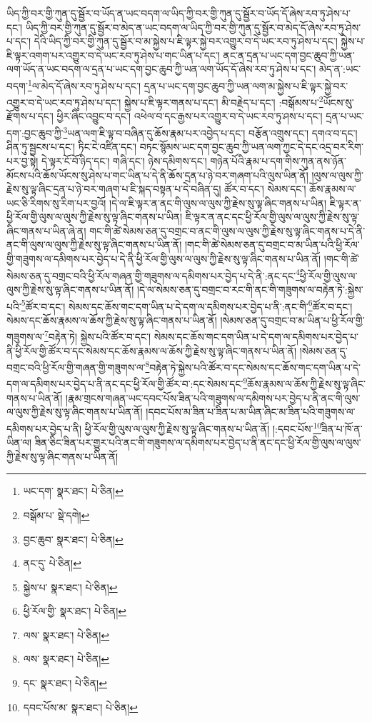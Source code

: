 ཡིད་ཀྱི་བར་གྱི་ཀུན་དུ་སྦྱོར་བ་ཡོད་ན་ཡང་བདག་ལ་ཡིད་ཀྱི་བར་གྱི་ཀུན་དུ་སྦྱོར་བ་ཡོད་དོ་ཞེས་རབ་ཏུ་ཤེས་པ་དང་། ཡིད་ཀྱི་བར་གྱི་ཀུན་དུ་སྦྱོར་བ་མེད་ན་ཡང་བདག་ལ་ཡིད་ཀྱི་བར་གྱི་ཀུན་དུ་སྦྱོར་བ་མེད་དོ་ཞེས་རབ་ཏུ་ཤེས་པ་དང་། དེའི་ཡིད་ཀྱི་བར་གྱི་ཀུན་དུ་སྦྱོར་བ་མ་སྐྱེས་པ་ཇི་ལྟར་སྐྱེ་བར་འགྱུར་བ་དེ་ཡང་རབ་ཏུ་ཤེས་པ་དང་། སྐྱེས་པ་ཇི་ལྟར་འགག་པར་འགྱུར་བ་དེ་ཡང་རབ་ཏུ་ཤེས་པ་གང་ཡིན་པ་དང་། ནང་ན་དྲན་པ་ཡང་དག་བྱང་ཆུབ་ཀྱི་ཡན་ལག་ཡོད་ན་ཡང་བདག་ལ་དྲན་པ་ཡང་དག་བྱང་ཆུབ་ཀྱི་ཡན་ལག་ཡོད་དོ་ཞེས་རབ་ཏུ་ཤེས་པ་དང་། མེད་ན་:ཡང་བདག་\footnote{ཡང་དག་  སྣར་ཐང་།  པེ་ཅིན། }ལ་མེད་དོ་ཞེས་རབ་ཏུ་ཤེས་པ་དང་། དྲན་པ་ཡང་དག་བྱང་ཆུབ་ཀྱི་ཡན་ལག་མ་སྐྱེས་པ་ཇི་ལྟར་སྐྱེ་བར་འགྱུར་བ་དེ་ཡང་རབ་ཏུ་ཤེས་པ་དང་། སྐྱེས་པ་ཇི་ལྟར་གནས་པ་དང་། མི་བརྗེད་པ་དང་། :བསྒོམས་པ་\footnote{བསྒོམ་པ་  སྡེ་དགེ། }ཡོངས་སུ་རྫོགས་པ་དང་། ཕྱིར་ཞིང་འབྱུང་བ་དང་། འཕེལ་བ་དང་རྒྱས་པར་འགྱུར་བ་དེ་ཡང་རབ་ཏུ་ཤས་པ་དང་། དྲན་པ་ཡང་དག་:བྱང་ཆུབ་ཀྱི་\footnote{བྱང་ཆུབ་  སྣར་ཐང་།  པེ་ཅིན། }ཡན་ལག་ཇི་ལྟ་བ་བཞིན་དུ་ཆོས་རྣམ་པར་འབྱེད་པ་དང་། བརྩོན་འགྲུས་དང་། དགའ་བ་དང་། ཤིན་ཏུ་སྦྱངས་པ་དང་། ཏིང་ངེ་འཛིན་དང་། བཏང་སྙོམས་ཡང་དག་བྱང་ཆུབ་ཀྱི་ཡན་ལག་ཀྱང་དེ་དང་འདྲ་བར་རིག་པར་བྱ་སྟེ། དེ་ལྟར་ངོ་བོ་ཉིད་དང་། གཞི་དང་། ཉེས་དམིགས་དང་། གཉེན་པོའི་རྣམ་པ་དག་གིས་ཀུན་ནས་ཉོན་མོངས་པའི་ཆོས་ཡོངས་སུ་ཤེས་པ་གང་ཡིན་པ་དེ་ནི་ཆོས་དྲན་པ་ཉེ་བར་གཞག་པའི་ལུས་ཡིན་ནོ། །ལུས་ལ་ལུས་ཀྱི་རྗེས་སུ་ལྟ་ཞིང་དྲན་པ་ཉེ་བར་གཞག་པ་ཇི་སྐད་བསྟན་པ་དེ་བཞིན་དུ། ཚོར་བ་དང་། སེམས་དང་། ཆོས་རྣམས་ལ་ཡང་ཅི་རིགས་སུ་རིག་པར་བྱའོ། །དེ་ལ་ཇི་ལྟར་ན་ནང་གི་ལུས་ལ་ལུས་ཀྱི་རྗེས་སུ་ལྟ་ཞིང་གནས་པ་ཡིན། ཇི་ལྟར་ན་ཕྱི་རོལ་གྱི་ལུས་ལ་ལུས་ཀྱི་རྗེས་སུ་ལྟ་ཞིང་གནས་པ་ཡིན། ཇི་ལྟར་ན་ནང་དང་ཕྱི་རོལ་གྱི་ལུས་ལ་ལུས་ཀྱི་རྗེས་སུ་ལྟ་ཞིང་གནས་པ་ཡིན་ཞེ་ན། གང་གི་ཚེ་སེམས་ཅན་དུ་བགྲང་བ་ནང་གི་ལུས་ལ་ལུས་ཀྱི་རྗེས་སུ་ལྟ་ཞིང་གནས་པ་དེ་ནི་ནང་གི་ལུས་ལ་ལུས་ཀྱི་རྗེས་སུ་ལྟ་ཞིང་གནས་པ་ཡིན་ནོ། །གང་གི་ཚེ་སེམས་ཅན་དུ་བགྲང་བ་མ་ཡིན་པའི་ཕྱི་རོལ་གྱི་གཟུགས་ལ་དམིགས་པར་བྱེད་པ་དེ་ནི་ཕྱི་རོལ་གྱི་ལུས་ལ་ལུས་ཀྱི་རྗེས་སུ་ལྟ་ཞིང་གནས་པ་ཡིན་ནོ། །གང་གི་ཚེ་སེམས་ཅན་དུ་བགྲང་བའི་ཕྱི་རོལ་གཞན་གྱི་གཟུགས་ལ་དམིགས་པར་བྱེད་པ་དེ་ནི་:ནང་དང་\footnote{ནང་དུ་  པེ་ཅིན། }ཕྱི་རོལ་གྱི་ལུས་ལ་ལུས་ཀྱི་རྗེས་སུ་ལྟ་ཞིང་གནས་པ་ཡིན་ནོ། །དེ་ལ་སེམས་ཅན་དུ་བགྲང་བ་རང་གི་ནང་གི་གཟུགས་ལ་བརྟེན་ཏེ་:སྐྱེས་པའི་\footnote{སྐྱེས་པ་  སྣར་ཐང་།  པེ་ཅིན། }ཚོར་བ་དང་། སེམས་དང་ཆོས་གང་དག་ཡིན་པ་དེ་དག་ལ་དམིགས་པར་བྱེད་པ་ནི་:ནང་གི་\footnote{ཕྱི་རོལ་གྱི་  སྣར་ཐང་།  པེ་ཅིན། }ཚོར་བ་དང་། སེམས་དང་ཆོས་རྣམས་ལ་ཆོས་ཀྱི་རྗེས་སུ་ལྟ་ཞིང་གནས་པ་ཡིན་ནོ། །སེམས་ཅན་དུ་བགྲང་བ་མ་ཡིན་པ་ཕྱི་རོལ་གྱི་གཟུགས་ལ་\footnote{ལས་  སྣར་ཐང་།  པེ་ཅིན། }བརྟེན་ཏེ། སྐྱེས་པའི་ཚོར་བ་དང་། སེམས་དང་ཆོས་གང་དག་ཡིན་པ་དེ་དག་ལ་དམིགས་པར་བྱེད་པ་ནི་ཕྱི་རོལ་གྱི་ཚོར་བ་དང་སེམས་དང་ཆོས་རྣམས་ལ་ཆོས་ཀྱི་རྗེས་སུ་ལྟ་ཞིང་གནས་པ་ཡིན་ནོ། །སེམས་ཅན་དུ་བགྲང་བའི་ཕྱི་རོལ་གྱི་གཞན་གྱི་གཟུགས་ལ་\footnote{ལས་  སྣར་ཐང་།  པེ་ཅིན། }བརྟེན་ཏེ་སྐྱེས་པའི་ཚོར་བ་དང་སེམས་དང་ཆོས་གང་དག་ཡིན་པ་དེ་དག་ལ་དམིགས་པར་བྱེད་པ་ནི་ནང་དང་ཕྱི་རོལ་གྱི་ཚོར་བ་:དང་སེམས་དང་\footnote{དང་  སྣར་ཐང་།  པེ་ཅིན། }ཆོས་རྣམས་ལ་ཆོས་ཀྱི་རྗེས་སུ་ལྟ་ཞིང་གནས་པ་ཡིན་ནོ། །རྣམ་གྲངས་གཞན་ཡང་དབང་པོས་ཟིན་པའི་གཟུགས་ལ་དམིགས་པར་བྱེད་པ་ནི་ནང་གི་ལུས་ལ་ལུས་ཀྱི་རྗེས་སུ་ལྟ་ཞིང་གནས་པ་ཡིན་ནོ། །དབང་པོས་མ་ཟིན་པ་ཟིན་པ་མ་ཡིན་ཞིང་མ་ཟིན་པའི་གཟུགས་ལ་དམིགས་པར་བྱེད་པ་ནི། ཕྱི་རོལ་གྱི་ལུས་ལ་ལུས་ཀྱི་རྗེས་སུ་ལྟ་ཞིང་གནས་པ་ཡིན་ནོ། །:དབང་པོས་\footnote{དབང་པོས་མ་  སྣར་ཐང་།  པེ་ཅིན། }ཟིན་པ་ཁོ་ན་ཡིན་ལ། ཟིན་ཅིང་ཟིན་པར་གྱུར་པའི་ནང་གི་གཟུགས་ལ་དམིགས་པར་བྱེད་པ་ནི་ནང་དང་ཕྱི་རོལ་གྱི་ལུས་ལ་ལུས་ཀྱི་རྗེས་སུ་ལྟ་ཞིང་གནས་པ་ཡིན་ནོ། 